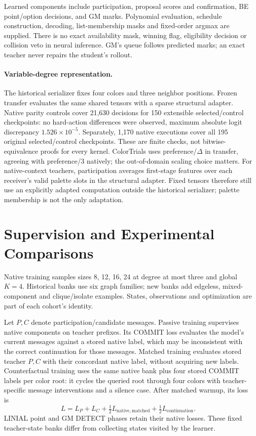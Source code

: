 \documentclass[10pt]{article}
\begin{document}
Learned components include participation, proposal scores and confirmation,
BE point/option decisions, and GM marks. Polynomial evaluation, schedule
construction, decoding, list-membership masks and fixed-order argmax are
supplied. There is no exact availability mask, winning flag, eligibility
decision or collision veto in neural inference. GM's queue follows predicted
marks; an exact teacher never repairs the student's rollout.



\paragraph{Variable-degree representation.}
The historical serializer fixes four colors and three neighbor positions.
Frozen transfer evaluates the same shared tensors with a sparse structural
adapter. Native parity controls cover 21,630 decisions for 150 extensible
selected/control checkpoints: no hard-action differences were observed,
maximum absolute logit discrepancy $1.526\times10^{-5}$. Separately, 1,170
native executions cover all 195 original selected/control checkpoints.
These are finite checks, not bitwise-equivalence proofs for every kernel.
ColorTrials uses preference/$\Delta$ in transfer, agreeing with preference/3
natively; the out-of-domain scaling choice matters.
For native-context teachers, participation averages first-stage features
over each receiver's valid palette slots in the structural adapter. Fixed
tensors therefore still use an explicitly adapted computation outside the
historical serializer; palette membership is not the only adaptation.

\section{Supervision and Experimental Comparisons}
\label{sec:learning}
Native training samples sizes 8, 12, 16, 24 at degree at most three and
global $K=4$. Historical banks use six graph families; new banks add
edgeless, mixed-component and clique/isolate examples. States, observations
and optimization are part of each cohort's identity.

Let $P,C$ denote participation/candidate messages. Passive training
supervises native components on teacher prefixes. Its COMMIT loss evaluates
the model's current messages against a stored native label, which may be
inconsistent with the correct continuation for those messages. Matched
training evaluates stored teacher $P,C$ with their concordant native label,
without acquiring new labels. Counterfactual training uses the same native
bank plus four stored COMMIT labels per color root: it cycles the queried
root through four colors with teacher-specific message interventions and a
silence case. After matched warmup, its loss is
\[
L=L_P+L_C+\tfrac12L_{\mathrm{native,matched}}+
\tfrac12L_{\mathrm{continuation}}.
\]
LINIAL point and GM DETECT phases retain their native losses. These fixed
teacher-state banks differ from collecting states visited by the learner.
\end{document}
